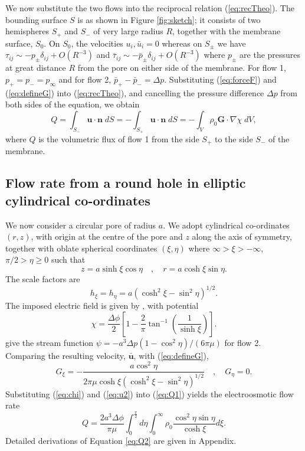We now substitute the two flows into the reciprocal relation (\ref{eq:recTheo}). The bounding surface $S$ is as shown in Figure \ref{fig:sketch}; it consists of two hemispheres $S_{+}$ and $S_{-}$ of very large radius $R$, together with the membrane surface, $S_{0}$.
On $S_{0}$, the velocities $u_{i}, \bar{u}_{i}=0$ whereas on 
$S_{\pm}$ we have $\tau_{ij} \sim - p_{\pm} \delta_{ij} + O(R^{-3})$ and 
$\bar{\tau}_{ij} \sim - \bar{p}_{\pm} \delta_{ij} + O(R^{-3})$ where $p_{\pm}$ are the pressures 
at great distance $R$ from the pore on either side of the membrane. 
For flow 1, $p_{+}=p_{-} = p_{\infty}$ and for flow 2, $\bar{p}_{+} - \bar{p}_{-} = \Delta p$. Substituting
(\ref{eq:forceF}) and (\ref{eq:defineG}) into (\ref{eq:recTheo}), and cancelling the pressure difference $\Delta p$ from both sides of the equation, we obtain
\begin{equation}
Q = \int_{S_-}\mathbf{u}\cdot\mathbf{n}\; dS=
 - \int_{S_+}\mathbf{u}\cdot\mathbf{n}\; dS =
- \int_V \rho_0 \mathbf{G} \cdot \nabla \chi \; dV,
\label{eq:Q1}
\end{equation}
where $Q$ is the volumetric flux of flow 1 from the side $S_{+}$ to the side $S_{-}$ of the 
membrane.

\subsection{Flow rate from a round hole in elliptic cylindrical co-ordinates\label{subsec:roundhole}}
We now consider a circular pore of radius $a$. We adopt cylindrical co-ordinates  $(r,z)$, with origin at the centre of the pore and $z$ along the axis of symmetry, together with oblate spherical coordinates $(\xi,\eta)$ where $\infty > \xi > - \infty$, $\pi/2 > \eta \geq 0$ such that
\begin{equation}
z=a\sinh\xi\cos\eta\quad,\quad r=a\cosh\xi\sin\eta.
\end{equation}
The scale factors are
\begin{equation}
h_\xi=h_\eta=a(\cosh^2\xi-\sin^2\eta)^{1/2}.
\end{equation}
The imposed electric field is given by \cite[p. 1292]{M&F}, with potential
\begin{equation}
\chi = \frac{\Delta \phi}{2} \left[ 1- \frac{2}{\pi}
\tan^{-1}\left( \frac{1}{\sinh \xi} \right) \right].
\label{eq:chi}
\end{equation}
\cite[p. 153]{Happel&Brenner}
give the stream function $\psi=-a^3\Delta p(1-\cos^2\eta)/(6\pi\mu)$ for
flow 2. Comparing the resulting velocity, $\bar{\mathbf{u}}$, with
(\ref{eq:defineG}),
\begin{equation}
G_\xi =  - \frac{a \cos^2\eta}{2\pi\mu
\cosh\xi(\cosh^2\xi-\sin^2\eta)^{1/2}}\quad,\quad
G_\eta  =  0.
\label{eq:u2}
\end{equation}
Substituting (\ref{eq:chi}) and (\ref{eq:u2}) into (\ref{eq:Q1}) yields the electroosmotic flow rate
\begin{equation}
Q   =  \frac{2a^3\Delta\phi}{\pi\mu}
\int_0^{\frac{\pi}{2}} d\eta \int_0^\infty \rho_0
\frac{\cos^2\eta\sin\eta}{\cosh\xi} d\xi.
\label{eq:Q2}
\end{equation}
Detailed derivations of Equation \ref{eq:Q2} are given in Appendix.

